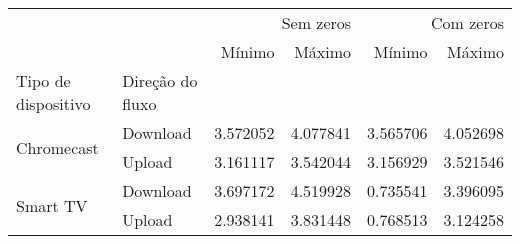 \begin{tabular}{llrrrr}
\toprule
 &  & \multicolumn{2}{r}{Sem zeros} & \multicolumn{2}{r}{Com zeros} \\
 &  & Mínimo & Máximo & Mínimo & Máximo \\
Tipo de dispositivo & Direção do fluxo &  &  &  &  \\
\midrule
\multirow[t]{2}{*}{Chromecast} & Download & 3.572052 & 4.077841 & 3.565706 & 4.052698 \\
 & Upload & 3.161117 & 3.542044 & 3.156929 & 3.521546 \\
\cline{1-6}
\multirow[t]{2}{*}{Smart TV} & Download & 3.697172 & 4.519928 & 0.735541 & 3.396095 \\
 & Upload & 2.938141 & 3.831448 & 0.768513 & 3.124258 \\
\cline{1-6}
\bottomrule
\end{tabular}
